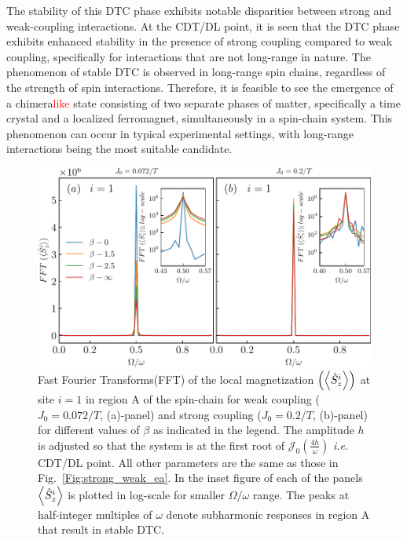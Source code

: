 \documentclass[12pt]{iopart}
\newcommand{\red}[1]{\textcolor{red}{#1}}
\begin{document}
The stability of this DTC phase exhibits notable disparities between strong and weak-coupling interactions. At the CDT/DL point, it is seen that the DTC phase exhibits enhanced stability in the presence of strong coupling compared to weak coupling, specifically for interactions that are not long-range in nature. The phenomenon of stable DTC is observed in long-range spin chains, regardless of the strength of spin interactions. Therefore, it is feasible to see the emergence of a chimera\red{like} state consisting of two separate phases of matter, specifically a time crystal and a localized ferromagnet, simultaneously in a spin-chain system. This phenomenon can occur in typical experimental settings, with long-range interactions being the most suitable candidate.
\begin{figure}[t!]
\centering
\includegraphics[width=10.cm]{figure5.pdf}
\caption{Fast Fourier Transforms(FFT) of the local magnetization $\left(\expval{\hat{S}_z^i}\right)$ at site $i=1$ in region A of the spin-chain for weak coupling ($J_0 = 0.072/T$, (a)-panel) and strong coupling ($J_0 = 0.2/T$, (b)-panel) for different values of $\beta$ as indicated in the legend. The amplitude $h$ is adjusted so that the system is at the first root of $\mathcal{J}_0\left(\frac{4h}{\omega}\right)$ \textit{i.e.} CDT/DL point. All other parameters are the same as those in Fig.~\ref{Fig:strong_weak_ea}. In the inset figure of each of the panels $\expval{\hat{S}_z^i}$ is plotted in log-scale for smaller $\Omega/\omega$ range. The peaks at half-integer multiples of $\omega$ denote subharmonic responses in region A that result in stable DTC.}
\label{Fig:sz_single}
\end{figure}
	
\end{document}
